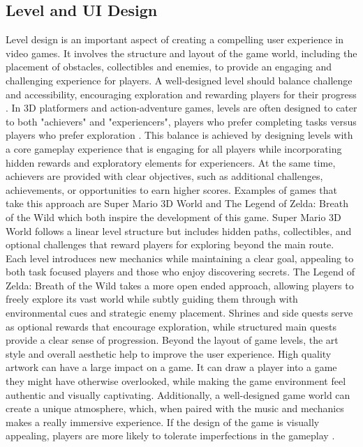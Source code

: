 \documentclass[10pt]{final_report}
\begin{document}
\subsection{Level and UI Design}\label{level}
Level design is an important aspect of creating a compelling user experience in video games. It involves the structure and layout of the game world, including the placement of obstacles, collectibles and enemies, to provide an engaging and challenging experience for players. A well-designed level should balance challenge and accessibility, encouraging exploration and rewarding players for their progress \cite{Kramarzewski2023}. In 3D platformers and action-adventure games, levels are often designed to cater to both "achievers" and "experiencers", players who prefer completing tasks versus players who prefer exploration \cite{zhao2022dynamic}. This balance is achieved by designing levels with a core gameplay experience that is engaging for all players while incorporating hidden rewards and exploratory elements for experiencers. At the same time, achievers are provided with clear objectives, such as additional challenges, achievements, or opportunities to earn higher scores. 
\newline
Examples of games that take this approach are Super Mario 3D World and The Legend of Zelda: Breath of the Wild which both inspire the development of this game. Super Mario 3D World follows a linear level structure but includes hidden paths, collectibles, and optional challenges that reward players for exploring beyond the main route. Each level introduces new mechanics while maintaining a clear goal, appealing to both task focused players and those who enjoy discovering secrets.
The Legend of Zelda: Breath of the Wild takes a more open ended approach, allowing players to freely explore its vast world while subtly guiding them through with environmental cues and strategic enemy placement. Shrines and side quests serve as optional rewards that encourage exploration, while structured main quests provide a clear sense of progression.
\newline
Beyond the layout of game levels, the art style and overall aesthetic help to improve the user experience. High quality artwork can have a large impact on a game. It can draw a player into a game they might have otherwise overlooked, while making the game environment feel authentic and visually captivating. Additionally, a well-designed game world can create a unique atmosphere, which, when paired with the music and mechanics makes a really immersive experience. If the design of the game is visually appealing, players are more likely to tolerate imperfections in the gameplay \cite{Jesse2019}. \newline
\end{document}
